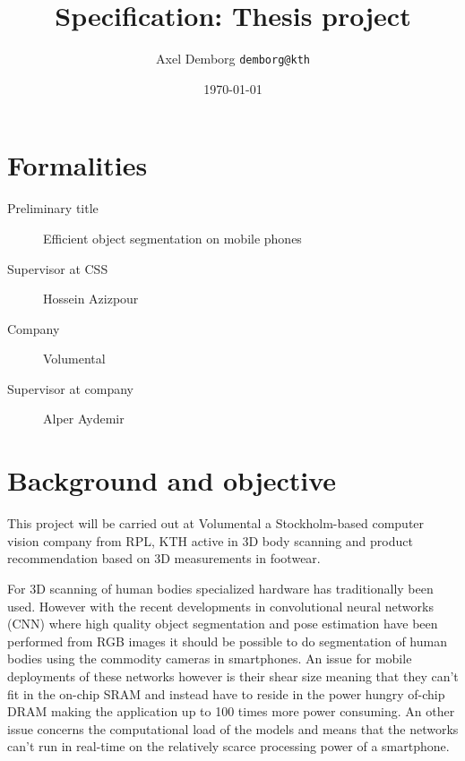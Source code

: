 \documentclass[11pt]{article}
\author{Axel Demborg \texttt{demborg@kth}}
\date{\today}
\title{Specification: Thesis project}
\newcommand{\bibentry}[1]{\cite{#1}}
\begin{document}
\maketitle

\section{Formalities}
\label{sec:org09328ac}
\begin{description}
\item[{Preliminary title}] Efficient object segmentation on mobile phones
\item[{Supervisor at CSS}] Hossein Azizpour
\item[{Company}] Volumental
\item[{Supervisor at company}] Alper Aydemir
\end{description}

\section{Background and objective}
\label{sec:orge90c554}
This project will be carried out at Volumental a Stockholm-based computer vision company from RPL, KTH active in 3D body scanning and product recommendation based on 3D measurements in footwear.

For 3D scanning of human bodies specialized hardware has traditionally been used. However with the recent developments in convolutional neural networks (CNN) where high quality object segmentation\bibentry{BriefHistory} and pose estimation\bibentry{he2017mask} have been performed from RGB images it should be possible to do segmentation of human bodies using the commodity cameras in smartphones. An issue for mobile deployments of these networks however is their shear size meaning that they can't fit in the on-chip SRAM and instead have to reside in the power hungry of-chip DRAM making the application up to 100 times more power consuming\bibentry{han2015learning}. An other issue concerns the computational load of the models and means that the networks can't run in real-time on the relatively scarce processing power of a smartphone.
\end{document}
